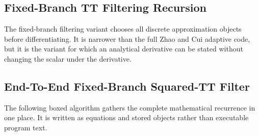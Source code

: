 \documentclass[11pt]{article}
\numberwithin{equation}{section}
\begin{document}
\subsection{Fixed-Branch TT Filtering Recursion}

The fixed-branch filtering variant chooses all discrete approximation objects
before differentiating.  It is narrower than the full Zhao and Cui \cite{zhao2024ttsequential} adaptive code,
but it is the variant for which an analytical derivative can be stated without
changing the scalar under the derivative.

\subsection{End-To-End Fixed-Branch Squared-TT Filter}

The following boxed algorithm gathers the complete mathematical recurrence in one
place.  It is written as equations and stored objects rather than executable
program text.
\end{document}
